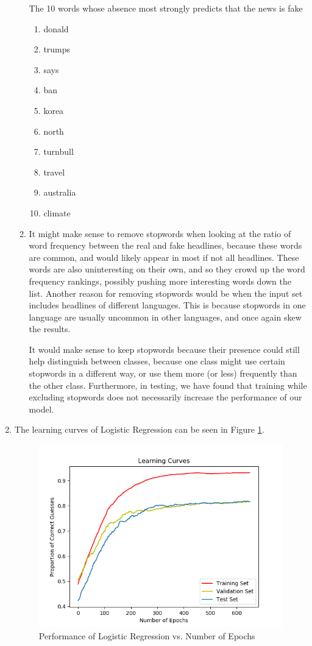 \documentclass[10pt,letterpaper]{article}
\begin{document}
\begin{enumerate}
\begin{enumerate}
			The 10 words whose absence most strongly predicts that the news is fake
			\begin{enumerate}
				\item donald
				\item trumps
				\item says
				\item ban
				\item korea
				\item north
				\item turnbull
				\item travel
				\item australia
				\item climate
			\end{enumerate}
			\item %
			It might make sense to remove stopwords when looking at the ratio of word frequency between the real and fake headlines, because these words are common, and would likely appear in most if not all headlines.
			These words are also uninteresting on their own, and so they crowd up the word frequency rankings, possibly pushing more interesting words down the list.
			Another reason for removing stopwords would be when the input set includes headlines of different languages.
			This is because stopwords in one language are usually uncommon in other languages, and once again skew the results.
			
			It would make sense to keep stopwords because their presence could still help distinguish between classes, because one class might use certain stopwords in a different way, or use them more (or less) frequently than the other class.
			Furthermore, in testing, we have found that training while excluding stopwords does not necessarily increase the performance of our model.
			
		\end{enumerate}
	\item %
	The learning curves of Logistic Regression can be seen in Figure \ref{fig:part4learningcurve}.
	\begin{figure}[H]
		\centering
		\includegraphics[width=\linewidth]{Part4LearningCurve}
		\caption{Performance of Logistic Regression vs. Number of Epochs}
		\label{fig:part4learningcurve}
	\end{figure}
	

\end{enumerate}
\end{document}
